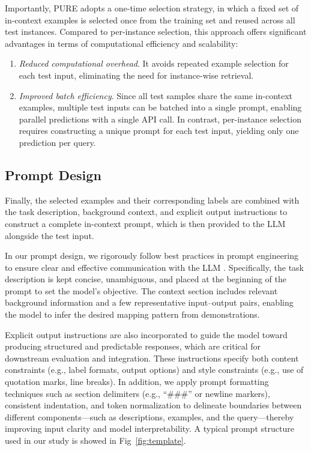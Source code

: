 \documentclass[journal,twocolumn]{IEEEtran}
\begin{document}
Importantly, PURE adopts a one-time selection strategy, in which a fixed set of in-context examples is selected once from the training set and reused across all test instances. Compared to per-instance selection, this approach offers significant advantages in terms of computational efficiency and scalability:

\begin{enumerate}
  \item \emph{Reduced computational overhead}. It avoids repeated example selection for each test input, eliminating the need for instance-wise retrieval.
  \item \emph{Improved batch efficiency}. Since all test samples share the same in-context examples, multiple test inputs can be batched into a single prompt, enabling parallel predictions with a single API call. In contrast, per-instance selection requires constructing a unique prompt for each test input, yielding only one prediction per query.
\end{enumerate}

\subsection{Prompt Design}

Finally, the selected examples and their corresponding labels are combined with the task description, background context, and explicit output instructions to construct a complete in-context prompt, which is then provided to the LLM alongside the test input.

In our prompt design, we rigorously follow best practices in prompt engineering to ensure clear and effective communication with the LLM \cite{chen2023unleashing}. Specifically, the task description is kept concise, unambiguous, and placed at the beginning of the prompt to set the model's objective. The context section includes relevant background information and a few representative input–output pairs, enabling the model to infer the desired mapping pattern from demonstrations.

Explicit output instructions are also incorporated to guide the model toward producing structured and predictable responses, which are critical for downstream evaluation and integration. These instructions specify both content constraints (e.g., label formats, output options) and style constraints (e.g., use of quotation marks, line breaks). In addition, we apply prompt formatting techniques such as section delimiters (e.g., “\#\#\#” or newline markers), consistent indentation, and token normalization to delineate boundaries between different components—such as descriptions, examples, and the query—thereby improving input clarity and model interpretability. A typical prompt structure used in our study is showed in Fig~\ref{fig:template}.
\end{document}
